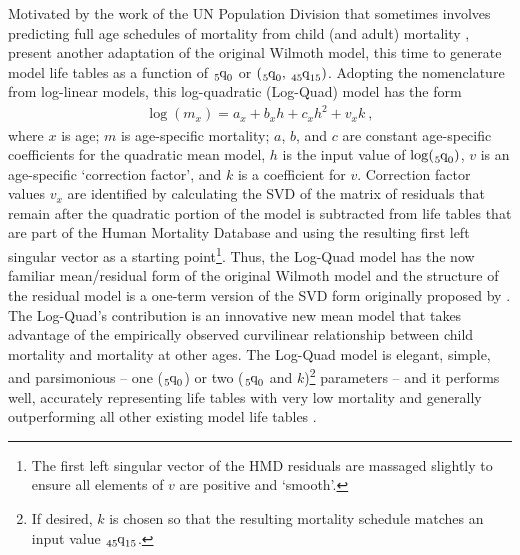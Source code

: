 \documentclass[11pt]{article}
\newcommand{\qf}{\tensor*[_5]{\mbox{q}}{_0}}
\newcommand{\qff}{\tensor*[_{45}]{\mbox{q}}{_{15}}}
\begin{document}
Motivated by the work of the UN Population Division that sometimes involves predicting full age schedules of mortality from child (and adult) mortality \citep{li2015wppLt}, \cite{wilmoth2012flexible} present another adaptation of the original Wilmoth model, this time to generate model life tables as a function of $\qf$ or  $\left(\qf, \, \qff \right)$.  Adopting the nomenclature from log-linear models, this log-quadratic (Log-Quad) model has the form %
%
\begin{align}
\log(m_x) = a_x + b_xh + c_xh^2 + v_xk \ ,
\label{eq:logquad}
\end{align} %
%
where $x$ is age; $m$ is age-specific mortality; $a$,  $b$, and $c$ are constant age-specific coefficients for the quadratic mean model, $h$ is the input value of $\log(\qf)$, $v$ is an age-specific `correction factor', and $k$ is a coefficient for $v$.  Correction factor values $v_x$ are identified by calculating the SVD of the matrix of residuals that remain after the quadratic portion of the model is subtracted from life tables that are part of the Human Mortality Database \citep{hmd2016} and using the resulting first left singular vector as a starting point\footnote{The first left singular vector of the HMD residuals are massaged slightly to ensure all elements of $v$ are positive and `smooth'.}.  Thus, the Log-Quad model has the now familiar mean/residual form of the original Wilmoth model and the structure of the residual model is a one-term version of the SVD form originally proposed by \cite{wilmoth1989quand}.  The Log-Quad's contribution is an innovative new mean model that takes advantage of the empirically observed curvilinear relationship between child mortality and mortality at other ages.  The Log-Quad model is elegant, simple, and parsimonious -- one ($\qf$) or two ($\qf$ and $k$)\footnote{If desired, $k$ is chosen so that the resulting mortality schedule matches an input value $\qff$.} parameters -- and it performs well, accurately representing  life tables with very low mortality\added{,} and generally outperforming all other existing model life tables \citep{wilmoth2012flexible}.
\end{document}
